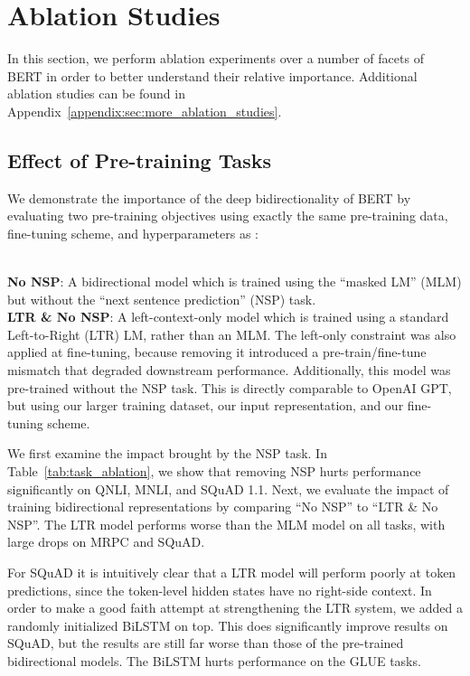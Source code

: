 \section{Ablation Studies}
\label{sec:ablation}
In this section, we perform ablation experiments over a number of facets of BERT in order to better understand their relative importance. Additional ablation studies can be found in Appendix~\ref{appendix:sec:more_ablation_studies}.

\subsection{Effect of Pre-training Tasks}

\label{sec:task_ablation}
We demonstrate the importance of the deep bidirectionality of BERT by evaluating two pre-training objectives using exactly the same pre-training data, fine-tuning scheme, and hyperparameters as \bertbase:

\\
\textbf{No NSP}: A bidirectional model which is trained using the ``masked LM'' (MLM) but without the ``next sentence prediction'' (NSP) task.\\
\textbf{LTR \& No NSP}: A left-context-only model which is trained using a standard Left-to-Right (LTR) LM, rather than an MLM. The left-only constraint was also applied at fine-tuning, because  removing it introduced a pre-train/fine-tune mismatch that degraded downstream performance. Additionally, this model was pre-trained without the NSP task. This is directly comparable to OpenAI GPT, but using our larger training dataset, our input representation, and our fine-tuning scheme.

We first examine the impact brought by the NSP task. In Table~\ref{tab:task_ablation}, we show that removing NSP hurts performance significantly on QNLI, MNLI, and SQuAD 1.1. Next, we evaluate the impact of training bidirectional representations by comparing ``No NSP'' to ``LTR \& No NSP''. The LTR model performs worse than the MLM model on all tasks, with large drops on MRPC and SQuAD.

For SQuAD it is intuitively clear that a LTR model will perform poorly at token predictions, since the token-level hidden states have no right-side context. In order to make a good faith attempt at strengthening the LTR system, we added a randomly initialized BiLSTM on top. This does significantly improve results on SQuAD, but the results are still far worse than those of the pre-trained bidirectional models. The BiLSTM hurts performance on the GLUE tasks. 

